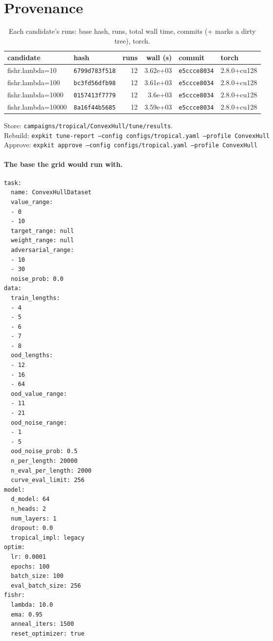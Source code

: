 \documentclass[10pt]{article}
\begin{document}
\section{Provenance}
{\small
\begin{longtable}{llrrll}
\caption{Each candidate's runs: base hash, runs, total wall time, commits (+ marks a dirty tree), torch.}\label{tab:provenance}\\
\toprule
candidate & hash & runs & wall (s) & commit & torch\\
\midrule
\endhead
fishr.lambda=10 & \texttt{6799d783f518} & 12 & 3.62e+03 & \texttt{e5ccce8034} & 2.8.0+cu128\\
fishr.lambda=100 & \texttt{bc3fd56dfb98} & 12 & 3.61e+03 & \texttt{e5ccce8034} & 2.8.0+cu128\\
fishr.lambda=1000 & \texttt{0157413f7779} & 12 & 3.6e+03 & \texttt{e5ccce8034} & 2.8.0+cu128\\
fishr.lambda=10000 & \texttt{8a16f44b5685} & 12 & 3.59e+03 & \texttt{e5ccce8034} & 2.8.0+cu128\\
\bottomrule
\end{longtable}
}
\noindent Store: \texttt{campaigns/tropical/ConvexHull/tune/results}.\\
Rebuild: \texttt{expkit tune-report --config configs/tropical.yaml --profile ConvexHull}\\
Approve: \texttt{expkit approve --config configs/tropical.yaml --profile ConvexHull}

\paragraph{The base the grid would run with.}
{\footnotesize
\begin{verbatim}
task:
  name: ConvexHullDataset
  value_range:
  - 0
  - 10
  target_range: null
  weight_range: null
  adversarial_range:
  - 10
  - 30
  noise_prob: 0.0
data:
  train_lengths:
  - 4
  - 5
  - 6
  - 7
  - 8
  ood_lengths:
  - 12
  - 16
  - 64
  ood_value_range:
  - 11
  - 21
  ood_noise_range:
  - 1
  - 5
  ood_noise_prob: 0.5
  n_per_length: 20000
  n_eval_per_length: 2000
  curve_eval_limit: 256
model:
  d_model: 64
  n_heads: 2
  num_layers: 1
  dropout: 0.0
  tropical_impl: legacy
optim:
  lr: 0.0001
  epochs: 100
  batch_size: 100
  eval_batch_size: 256
fishr:
  lambda: 10.0
  ema: 0.95
  anneal_iters: 1500
  reset_optimizer: true
\end{verbatim}
}

\clearpage
\appendix
\end{document}
